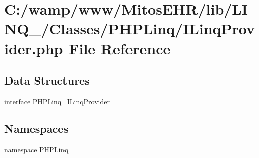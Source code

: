 \hypertarget{_i_linq_provider_8php}{\section{\-C\-:/wamp/www/\-Mitos\-E\-H\-R/lib/\-L\-I\-N\-Q\-\_/\-Classes/\-P\-H\-P\-Linq/\-I\-Linq\-Provider.php \-File \-Reference}
\label{_i_linq_provider_8php}
}
\subsection*{\-Data \-Structures}
\begin{DoxyCompactItemize}
\item 
interface \hyperlink{interface_p_h_p_linq___i_linq_provider}{\-P\-H\-P\-Linq\-\_\-\-I\-Linq\-Provider}
\end{DoxyCompactItemize}
\subsection*{\-Namespaces}
\begin{DoxyCompactItemize}
\item 
namespace \hyperlink{namespace_p_h_p_linq}{\-P\-H\-P\-Linq}
\end{DoxyCompactItemize}
